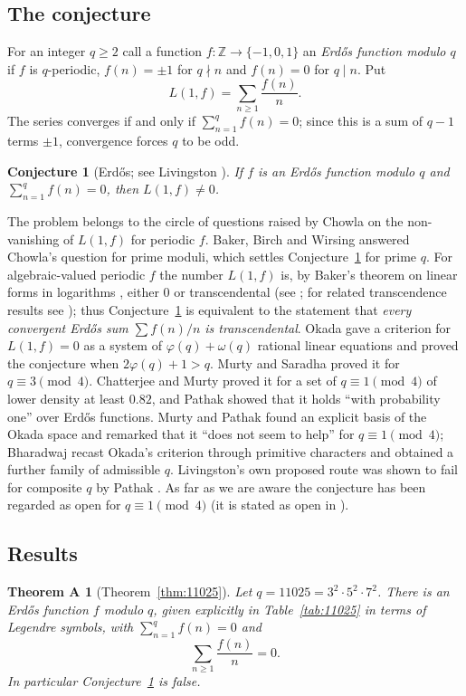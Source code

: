 \documentclass[11pt]{amsart}
\newtheorem{conjecture}[theorem]{Conjecture}
\newtheorem*{mainA}{Theorem A}
\theoremstyle{definition}
\theoremstyle{remark}
\providecommand{\Z}{\mathbb Z}
\numberwithin{equation}{section}
\begin{document}
\subsection{The conjecture}
For an integer $q\ge2$ call a function $f\colon\Z\to\{-1,0,1\}$ an \emph{Erd\H{o}s function modulo $q$} if $f$ is $q$-periodic, $f(n)=\pm1$ for $q\nmid n$ and $f(n)=0$ for $q\mid n$.
Put
\[
L(1,f)=\sum_{n\ge1}\frac{f(n)}{n}.
\]
The series converges if and only if $\sum_{n=1}^{q}f(n)=0$; since this is a sum of $q-1$ terms $\pm1$, convergence forces $q$ to be odd.

\begin{conjecture}[Erd\H{o}s; see Livingston \cite{Liv65}]\label{conj:erdos}
If $f$ is an Erd\H{o}s function modulo $q$ and $\sum_{n=1}^{q}f(n)=0$, then $L(1,f)\neq0$.
\end{conjecture}

The problem belongs to the circle of questions raised by Chowla \cite{Cho70} on the non-vanishing of $L(1,f)$ for periodic $f$.
Baker, Birch and Wirsing \cite{BBW73} answered Chowla's question for prime moduli, which settles Conjecture~\ref{conj:erdos} for prime $q$.
For algebraic-valued periodic $f$ the number $L(1,f)$ is, by Baker's theorem on linear forms in logarithms \cite{Bak75}, either $0$ or transcendental (see \cite{BBW73,MS07}; for related transcendence results see \cite{ST03}); thus Conjecture~\ref{conj:erdos} is equivalent to the statement that \emph{every convergent Erd\H{o}s sum $\sum f(n)/n$ is transcendental}.
Okada \cite{Oka82} gave a criterion for $L(1,f)=0$ as a system of $\varphi(q)+\omega(q)$ rational linear equations and proved the conjecture when $2\varphi(q)+1>q$.
Murty and Saradha \cite{MS10} proved it for $q\equiv 3\pmod 4$.
Chatterjee and Murty \cite{CM15} proved it for a set of $q\equiv1\pmod4$ of lower density at least $0.82$, and Pathak \cite{Pat19} showed that it holds ``with probability one'' over Erd\H{o}s functions.
Murty and Pathak \cite{MP22} found an explicit basis of the Okada space and remarked that it ``does not seem to help'' for $q\equiv1\pmod4$; Bharadwaj \cite{Bha22} recast Okada's criterion through primitive characters and obtained a further family of admissible $q$.
Livingston's own proposed route was shown to fail for composite $q$ by Pathak \cite{Pat17}.
As far as we are aware the conjecture has been regarded as open for $q\equiv1\pmod4$ (it is stated as open in \cite{Pat19,MP22,Bha22}).

\subsection{Results}
\begin{mainA}[Theorem~\ref{thm:11025}]
Let $q=11025=3^2\cdot5^2\cdot7^2$.
There is an Erd\H{o}s function $f$ modulo $q$, given explicitly in Table~\ref{tab:11025} in terms of Legendre symbols, with $\sum_{n=1}^{q}f(n)=0$ and
\[
\sum_{n\ge1}\frac{f(n)}{n}=0 .
\]
In particular Conjecture~\ref{conj:erdos} is false.
\end{mainA}
\end{document}
